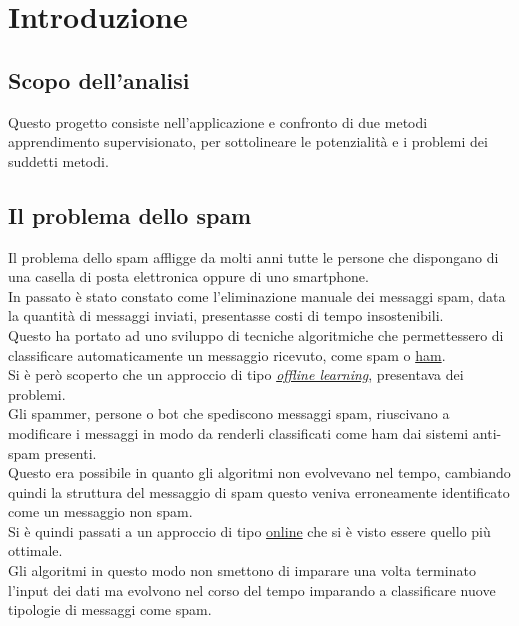 \newpage
\section{Introduzione}
\subsection{Scopo dell'analisi}
Questo progetto consiste nell'applicazione e confronto di due metodi apprendimento supervisionato, per sottolineare le potenzialità e i problemi dei suddetti metodi.

\subsection{Il problema dello spam}
Il problema dello spam affligge da molti anni tutte le persone che dispongano di una casella di posta elettronica oppure di uno smartphone.\\
In passato è stato constato come l'eliminazione manuale dei messaggi spam, data la quantità di messaggi inviati, presentasse costi di tempo insostenibili.\\
Questo ha portato ad uno sviluppo di tecniche algoritmiche che permettessero di classificare automaticamente un messaggio ricevuto, come spam o \href{https://en.wiktionary.org/wiki/ham_e-mail}{ham}.\\
Si è però scoperto che un approccio di tipo \href{https://en.wikipedia.org/wiki/Offline_learning}{\textit{offline learning}}, presentava dei problemi.\\
Gli spammer, persone o bot che spediscono messaggi spam, riuscivano a modificare i messaggi in modo da renderli classificati come ham dai sistemi anti-spam presenti.\\
Questo era possibile in quanto gli algoritmi non evolvevano nel tempo, cambiando quindi la struttura del messaggio di spam questo veniva erroneamente identificato come un messaggio non spam.\\
Si è quindi passati a un approccio di tipo \href{https://en.wikipedia.org/wiki/Online_algorithm}{online} che si è visto essere quello più ottimale.\\
Gli algoritmi in questo modo non smettono di imparare una volta terminato l'input dei dati ma evolvono nel corso del tempo imparando a classificare nuove tipologie di messaggi come spam. 
